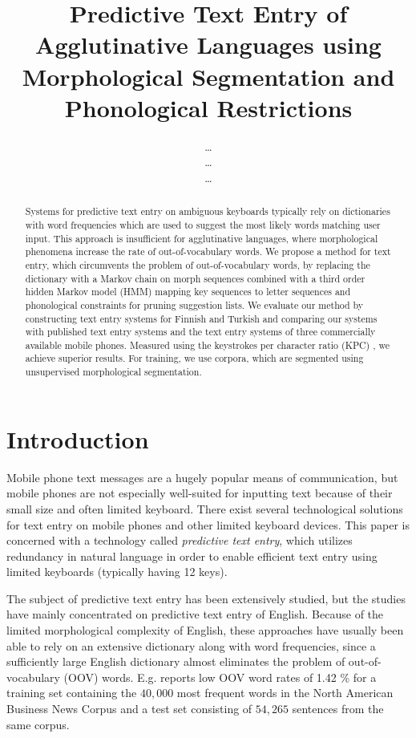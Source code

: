 \documentclass{llncs}
\begin{document}
\title{Predictive Text Entry of Agglutinative Languages using Morphological Segmentation and Phonological Restrictions}

\author{\ldots\\\ldots\\\ldots}
\institute{\ldots}

\maketitle

\begin{abstract}
Systems for predictive text entry on ambiguous keyboards typically
rely on dictionaries with word frequencies which are used to suggest
the most likely words matching user input. This approach is
insufficient for agglutinative languages, where morphological
phenomena increase the rate of out-of-vocabulary words. We propose a
method for text entry, which circumvents the problem of
out-of-vocabulary words, by replacing the dictionary with a Markov
chain on morph sequences combined with a third order hidden Markov
model (HMM) mapping key sequences to letter sequences and phonological
constraints for pruning suggestion lists. We evaluate our method by
constructing text entry systems for Finnish and Turkish and comparing
our systems with published text entry systems and the text entry systems
of three commercially available mobile phones. Measured using the
keystrokes per character ratio (KPC) \cite{MacKenzie02kspc}, we
achieve superior results. For training, we use corpora, which are
segmented using unsupervised morphological segmentation.
\end{abstract}

\section{Introduction}

Mobile phone text messages are a hugely popular means of
communication, but mobile phones are not especially well-suited for
inputting text because of their small size and often limited
keyboard. There exist several technological solutions for text entry
on mobile phones and other limited keyboard devices. This paper is
concerned with a technology called \textit{predictive text entry}, which
utilizes redundancy in natural language in order to enable efficient
text entry using limited keyboards (typically having 12 keys).

The subject of predictive text entry has been extensively studied, but
the studies have mainly concentrated on predictive text entry of
English. Because of the limited morphological complexity of English,
these approaches have usually been able to rely on an extensive
dictionary along with word frequencies, since a sufficiently large
English dictionary almost eliminates the problem of out-of-vocabulary
(OOV) words. E.g. \cite{klarlund/2002} reports low OOV word rates of
1.42 \% for a training set containing the $40,000$ most frequent words
in the North American Business News Corpus and a test set consisting
of $54,265$ sentences from the same corpus.
\end{document}
